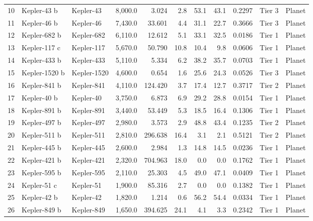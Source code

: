 \begin{longtable}{r l l r r r r r r l l}
10 & Kepler-43 b      & Kepler-43    &   8,000.0 &   3.024 &   2.8 &   53.1 &   43.1 &  0.2297 & Tier 3  & Planet \\
11 & Kepler-46 b      & Kepler-46    &   7,430.0 &  33.601 &   4.4 &   31.1 &   22.7 &  0.3666 & Tier 3  & Planet \\
12 & Kepler-682 b     & Kepler-682   &   6,110.0 &  12.612 &   5.1 &   33.1 &   32.5 &  0.0186 & Tier 1  & Planet \\
13 & Kepler-117 c     & Kepler-117   &   5,670.0 &  50.790 &  10.8 &   10.4 &    9.8 &  0.0606 & Tier 1  & Planet \\
14 & Kepler-433 b     & Kepler-433   &   5,110.0 &   5.334 &   6.2 &   38.2 &   35.7 &  0.0703 & Tier 1  & Planet \\
15 & Kepler-1520 b    & Kepler-1520  &   4,600.0 &   0.654 &   1.6 &   25.6 &   24.3 &  0.0526 & Tier 3  & Planet \\
16 & Kepler-841 b     & Kepler-841   &   4,110.0 & 124.420 &   3.7 &   17.4 &   12.7 &  0.3717 & Tier 2  & Planet \\
17 & Kepler-40 b      & Kepler-40    &   3,750.0 &   6.873 &   6.9 &   29.2 &   28.8 &  0.0154 & Tier 1  & Planet \\
18 & Kepler-891 b     & Kepler-891   &   3,440.0 &  53.449 &   5.3 &   18.5 &   16.4 &  0.1306 & Tier 1  & Planet \\
19 & Kepler-497 b     & Kepler-497   &   2,980.0 &   3.573 &   2.9 &   48.8 &   43.4 &  0.1235 & Tier 2  & Planet \\
20 & Kepler-511 b     & Kepler-511   &   2,810.0 & 296.638 &  16.4 &    3.1 &    2.1 &  0.5121 & Tier 2  & Planet \\
21 & Kepler-445 b     & Kepler-445   &   2,600.0 &   2.984 &   1.3 &   14.8 &   14.5 &  0.0236 & Tier 1  & Planet \\
22 & Kepler-421 b     & Kepler-421   &   2,320.0 & 704.963 &  18.0 &    0.0 &    0.0 &  0.1762 & Tier 1  & Planet \\
23 & Kepler-595 b     & Kepler-595   &   2,110.0 &  25.303 &   4.5 &   49.0 &   47.1 &  0.0409 & Tier 1  & Planet \\
24 & Kepler-51 c      & Kepler-51    &   1,900.0 &  85.316 &   2.7 &    0.0 &    0.0 &  0.1382 & Tier 1  & Planet \\
25 & Kepler-42 b      & Kepler-42    &   1,820.0 &   1.214 &   0.6 &   56.2 &   54.4 &  0.0334 & Tier 1  & Planet \\
26 & Kepler-849 b     & Kepler-849   &   1,650.0 & 394.625 &  24.1 &    4.1 &    3.3 &  0.2342 & Tier 1  & Planet \\

\end{longtable}

